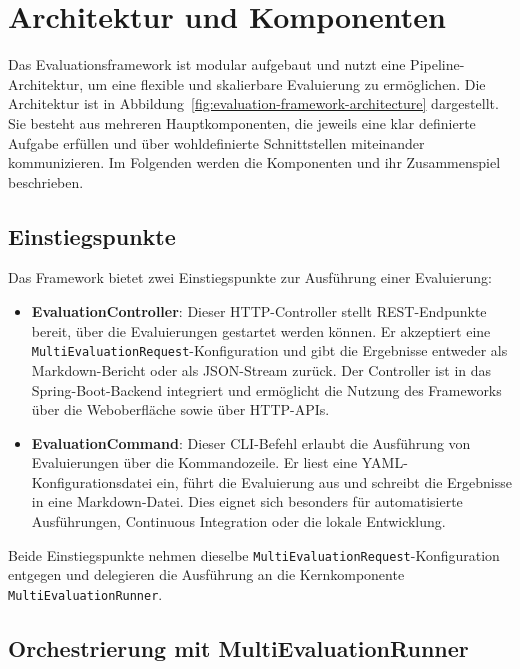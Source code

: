 \section{Architektur und Komponenten}\label{sec:architektur-und-komponenten}

Das Evaluationsframework ist modular aufgebaut und nutzt eine Pipeline-Architektur, um eine flexible und skalierbare Evaluierung zu ermöglichen. Die Architektur ist in Abbildung~\ref{fig:evaluation-framework-architecture} dargestellt. Sie besteht aus mehreren Hauptkomponenten, die jeweils eine klar definierte Aufgabe erfüllen und über wohldefinierte Schnittstellen miteinander kommunizieren. Im Folgenden werden die Komponenten und ihr Zusammenspiel beschrieben.

\subsection*{Einstiegspunkte}

Das Framework bietet zwei Einstiegspunkte zur Ausführung einer Evaluierung:

\begin{itemize}
    \item \textbf{EvaluationController}: Dieser HTTP-Controller stellt REST-Endpunkte bereit, über die Evaluierungen gestartet werden können. Er akzeptiert eine \texttt{MultiEvaluationRequest}-Konfiguration und gibt die Ergebnisse entweder als Markdown-Bericht oder als JSON-Stream zurück. Der Controller ist in das Spring-Boot-Backend integriert und ermöglicht die Nutzung des Frameworks über die Weboberfläche sowie über HTTP-APIs.
    \item \textbf{EvaluationCommand}: Dieser CLI-Befehl erlaubt die Ausführung von Evaluierungen über die Kommandozeile. Er liest eine YAML-Konfigurationsdatei ein, führt die Evaluierung aus und schreibt die Ergebnisse in eine Markdown-Datei. Dies eignet sich besonders für automatisierte Ausführungen, Continuous Integration oder die lokale Entwicklung.
\end{itemize}

Beide Einstiegspunkte nehmen dieselbe \texttt{MultiEvaluationRequest}-Konfiguration entgegen und delegieren die Ausführung an die Kernkomponente \texttt{MultiEvaluationRunner}.

\subsection*{Orchestrierung mit MultiEvaluationRunner}

